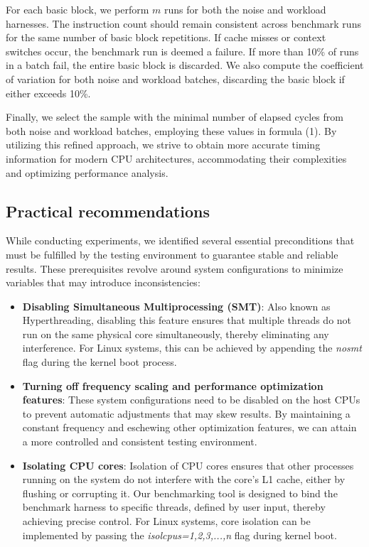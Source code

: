For each basic block, we perform $m$ runs for both the noise and workload harnesses. The instruction count should remain consistent across benchmark runs for the same number of basic block repetitions. If cache misses or context switches occur, the benchmark run is deemed a failure. If more than 10\% of runs in a batch fail, the entire basic block is discarded. We also compute the coefficient of variation for both noise and workload batches, discarding the basic block if either exceeds 10\%.

Finally, we select the sample with the minimal number of elapsed cycles from both noise and workload batches, employing these values in formula (1). By utilizing this refined approach, we strive to obtain more accurate timing information for modern CPU architectures, accommodating their complexities and optimizing performance analysis.

\subsection{Practical recommendations}

While conducting experiments, we identified several essential preconditions that must be fulfilled by the testing environment to guarantee stable and reliable results. These prerequisites revolve around system configurations to minimize variables that may introduce inconsistencies:

\begin{itemize}
	\item \textbf{Disabling Simultaneous Multiprocessing (SMT)}: Also known as Hyperthreading, disabling this feature ensures that multiple threads do not run on the same physical core simultaneously, thereby eliminating any interference. For Linux systems, this can be achieved by appending the \textit{nosmt} flag during the kernel boot process.
	\item \textbf{Turning off frequency scaling and performance optimization features}: These system configurations need to be disabled on the host CPUs to prevent automatic adjustments that may skew results. By maintaining a constant frequency and eschewing other optimization features, we can attain a more controlled and consistent testing environment.
	\item \textbf{Isolating CPU cores}: Isolation of CPU cores ensures that other processes running on the system do not interfere with the core's L1 cache, either by flushing or corrupting it. Our benchmarking tool is designed to bind the benchmark harness to specific threads, defined by user input, thereby achieving precise control. For Linux systems, core isolation can be implemented by passing the \textit{isolcpus=1,2,3,...,n} flag during kernel boot.
\end{itemize}

